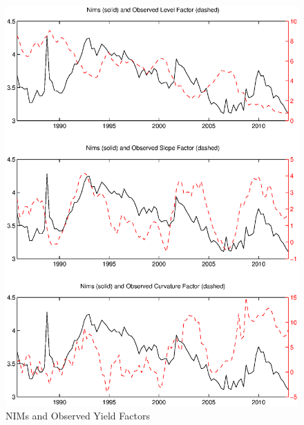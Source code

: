 \documentclass[11pt]{article}
\begin{document}
\newpage \clearpage
\begin{figure}
\caption{NIMs and Observed Yield Factors} \label{figure_nims_factors}
\center
\includegraphics[scale=0.85]{figure_nims_factors.ps}
\end{figure}
\end{document}
